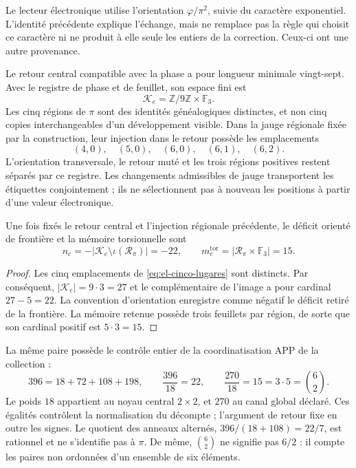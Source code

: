Le lecteur électronique utilise l'orientation \(\varphi/\pi^2\),
suivie du caractère exponentiel. L'identité précédente explique
l'échange, mais ne remplace pas la règle qui choisit ce caractère ni ne produit
à elle seule les entiers de la correction. Ceux-ci ont une autre provenance.

Le retour central compatible avec la phase a pour longueur minimale vingt-sept. Avec le registre de phase et de feuillet, son espace fini est
\[
 \mathcal K_e=\mathbb Z/9\mathbb Z\times\mathbb F_3.
\]
Les cinq régions de \(\pi\) sont des identités généalogiques distinctes,
et non cinq copies interchangeables d'un développement visible. Dans la jauge
régionale fixée par la construction, leur injection dans le retour possède
les emplacements
\begin{equation}
 (4,0),\quad(5,0),\quad(6,0),\quad(6,1),\quad(6,2).
 \label{eq:el-cinco-lugares}
\end{equation}
L'orientation transversale, le retour muté et les trois régions positives restent séparés par ce registre. Les changements admissibles de jauge transportent les étiquettes conjointement ; ils ne sélectionnent pas à nouveau les positions à partir d'une valeur électronique.

\begin{proposition}
Une fois fixés le retour central et l'injection régionale précédente, le déficit
orienté de frontière et la mémoire torsionnelle sont
\begin{equation}
 n_e=-|\mathcal K_e\setminus\iota(\mathscr R_\pi)|=-22,
 \qquad
 m_e^{\mathrm{tor}}=|\mathscr R_\pi\times\mathbb F_3|=15.
 \label{eq:el-selector-enteros}
\end{equation}
\end{proposition}
\begin{proof}
Les cinq emplacements de \eqref{eq:el-cinco-lugares} sont distincts. Par
conséquent, \(|\mathcal K_e|=9\cdot3=27\) et le complémentaire de l'image
a pour cardinal \(27-5=22\). La convention d'orientation enregistre comme
négatif le déficit retiré de la frontière. La mémoire retenue possède
trois feuillets par région, de sorte que son cardinal positif est
\(5\cdot3=15\).
\end{proof}

La même paire possède le contrôle entier de la coordinatisation APP de la collection :
\begin{equation}
 396=18+72+108+198,
 \qquad \frac{396}{18}=22,
 \qquad \frac{270}{18}=15=3\cdot5=\binom62.
 \label{eq:el-censo}
\end{equation}
Le poids \(18\) appartient au noyau central \(2\times2\), et \(270\) au canal global déclaré. Ces égalités contrôlent la normalisation du décompte ; l'argument de retour fixe en outre les signes. Le quotient des anneaux alternés, \(396/(18+108)=22/7\), est rationnel et ne s'identifie pas à \(\pi\). De même, \(\binom62\) ne signifie pas \(6/2\) : il compte les paires non ordonnées d'un ensemble de six éléments.

